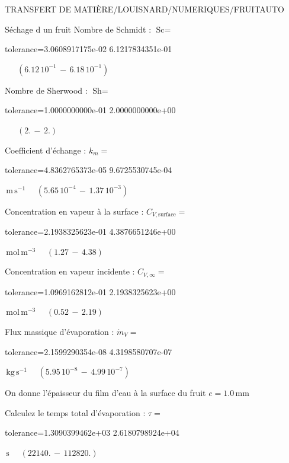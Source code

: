 \documentclass[12pt]{article}
\begin{document}
\begin{quiz}{TRANSFERT DE MATIÈRE/LOUISNARD/NUMERIQUES/FRUITAUTO}
\begin{cloze}{Séchage d un fruit}
Nombre de Schmidt : $\text{Sc} =  $
\begin{numerical}[points=1] 
\item[tolerance={3.0608917175e-02}] 6.1217834351e-01 
\end{numerical} 
 $\,$ 
 $ \quad ( 6.12 \, 10^{-1}  \, - \,  6.18 \, 10^{-1} ) $ 

Nombre de Sherwood : $\text{Sh} =  $
\begin{numerical}[points=2] 
\item[tolerance={1.0000000000e-01}] 2.0000000000e+00 
\end{numerical} 
 $\,$ 
 $ \quad (2. \, - \, 2.) $ 

Coefficient d'échange : $k_m =  $
\begin{numerical}[points=1] 
\item[tolerance={4.8362765373e-05}] 9.6725530745e-04 
\end{numerical} 
 $\,  \mathrm{m}\,  \mathrm{s}^{-1}$ 
 $ \quad ( 5.65 \, 10^{-4}  \, - \,  1.37 \, 10^{-3} ) $ 

Concentration en vapeur à la surface : $C_{V, \text{surface}} =  $
\begin{numerical}[points=2] 
\item[tolerance={2.1938325623e-01}] 4.3876651246e+00 
\end{numerical} 
 $\,  \mathrm{mol}\,  \mathrm{m}^{-3}$ 
 $ \quad (1.27 \, - \, 4.38) $ 

Concentration en vapeur incidente : $C_{V, \infty} =  $
\begin{numerical}[points=2] 
\item[tolerance={1.0969162812e-01}] 2.1938325623e+00 
\end{numerical} 
 $\,  \mathrm{mol}\,  \mathrm{m}^{-3}$ 
 $ \quad (0.52 \, - \, 2.19) $ 

Flux massique d'évaporation : $\dot{m}_V =  $
\begin{numerical}[points=1] 
\item[tolerance={2.1599290354e-08}] 4.3198580707e-07 
\end{numerical} 
 $\,  \mathrm{kg}\,  \mathrm{s}^{-1}$ 
 $ \quad ( 5.95 \, 10^{-8}  \, - \,  4.99 \, 10^{-7} ) $ 

 

On donne l'épaisseur du film d'eau à la surface du fruit $e = 1.0\,  \mathrm{mm} $

Calculez le temps total d'évaporation : $\tau =  $
\begin{numerical}[points=2] 
\item[tolerance={1.3090399462e+03}] 2.6180798924e+04 
\end{numerical} 
 $\,  \mathrm{s}$ 
 $ \quad (22140. \, - \, 112820.) $ 


\end{cloze}
\end{quiz}
\end{document}
